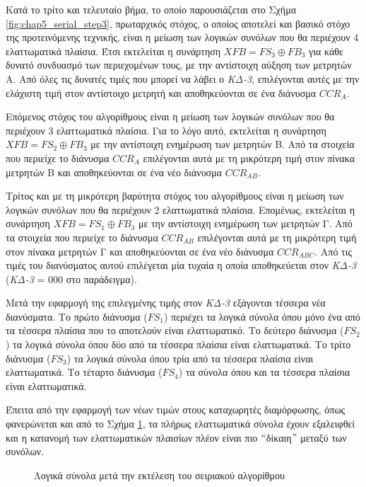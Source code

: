 Κατά το τρίτο και τελευταίο βήμα, το οποίο παρουσιάζεται στο Σχήμα \ref{fig:chap5_serial_step3}, πρωταρχικός στόχος, ο οποίος αποτελεί και βασικό στόχο της προτεινόμενης τεχνικής, είναι η μείωση των λογικών συνόλων που θα περιέχουν 4 ελαττωματικά πλαίσια. Έτσι εκτελείται η συνάρτηση $XFB = FS_{3} \oplus FB_{3}$ για κάθε δυνατό συνδυασμό των περιεχομένων τους, με την αντίστοιχη αύξηση των μετρητών Α. Από όλες τις δυνατές τιμές που μπορεί να λάβει ο \textit{ΚΔ-3}, επιλέγονται αυτές με την ελάχιστη τιμή στον αντίστοιχο μετρητή και αποθηκεύονται σε ένα διάνυσμα $CCR_{A}$.
\par
Επόμενος στόχος του αλγορίθμους είναι η μείωση των λογικών συνόλων που θα περιέχουν 3 ελαττωματικά πλαίσια. Για το λόγο αυτό, εκτελείται η συνάρτηση $XFB = FS_{2} \oplus FB_{3}$ με την αντίστοιχη ενημέρωση των μετρητών Β. Από τα στοιχεία που περιείχε το διάνυσμα $CCR_{A}$ επιλέγονται αυτά με τη μικρότερη τιμή στον πίνακα μετρητών Β και αποθηκεύονται σε ένα νέο διάνυσμα $CCR_{AB}$.
\par
Τρίτος και με τη μικρότερη βαρύτητα στόχος του αλγορίθμους είναι η μείωση των λογικών συνόλων που θα περιέχουν 2 ελαττωματικά πλαίσια. Επομένως, εκτελείται η συνάρτηση $XFB = FS_{1} \oplus FB_{3}$ με την αντίστοιχη ενημέρωση των μετρητών Γ. Από τα στοιχεία που περιείχε το διάνυσμα $CCR_{AB}$ επιλέγονται αυτά με τη μικρότερη τιμή στον πίνακα μετρητών Γ και αποθηκεύονται σε ένα νέο διάνυσμα $CCR_{ABC}$. Από τις τιμές του διανύσματος αυτού επιλέγεται μία τυχαία η οποία αποθηκεύεται στον \textit{ΚΔ-3} (\textit{ΚΔ-3} = 000 στο παράδειγμα).
\par
Μετά την εφαρμογή της επιλεγμένης τιμής στον \textit{ΚΔ-3} εξάγονται τέσσερα νέα διανύσματα. Το πρώτο διάνυσμα ($FS_{1}$) περιέχει τα λογικά σύνολα όπου μόνο ένα από τα τέσσερα πλαίσια που το αποτελούν είναι ελαττωματικό. Το δεύτερο διάνυσμα ($FS_{2}$) τα λογικά σύνολα όπου δύο από τα τέσσερα πλαίσια είναι ελαττωματικά. Το τρίτο διάνυσμα ($FS_{3}$) τα λογικά σύνολα όπου τρία από τα τέσσερα πλαίσια είναι ελαττωματικά. Το τέταρτο διάνυσμα ($FS_{4}$) τα σύνολα όπου και τα τέσσερα πλαίσια είναι ελαττωματικά.
\par
Έπειτα από την εφαρμογή των νέων τιμών στους καταχωρητές διαμόρφωσης, όπως φανερώνεται και από το Σχήμα \ref{fig:chap5_serial_final}, τα πλήρως ελαττωματικά σύνολα έχουν εξαλειφθεί και η κατανομή των ελαττωματικών πλαισίων πλέον είναι πιο $``$δίκαιη$"$ μεταξύ των συνόλων.

\begin{figure}[h]
    \centering
    \caption{Λογικά σύνολα μετά την εκτέλεση του σειριακού αλγορίθμου}
    \label{fig:chap5_serial_final}
\end{figure}


